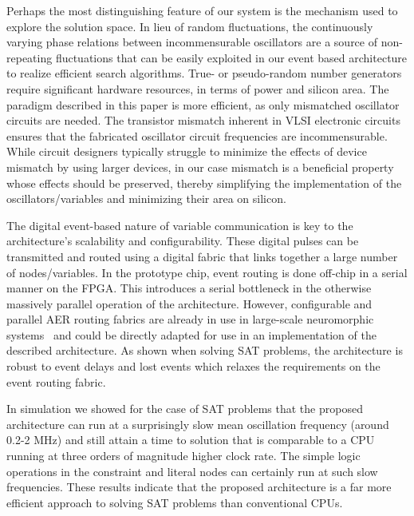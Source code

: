 \documentclass[10pt]{article}
\begin{document}
Perhaps the most distinguishing feature of our system is the mechanism used to explore the solution space. In lieu of random fluctuations, the continuously varying phase relations between incommensurable oscillators are a source of non-repeating fluctuations that can be easily exploited in our event based architecture to realize efficient search algorithms.  True- or pseudo-random number generators require significant hardware resources, in terms of power and silicon area. The paradigm described in this paper is more efficient, as only  mismatched oscillator circuits are needed. The transistor mismatch inherent in VLSI electronic circuits ensures that the fabricated oscillator circuit frequencies are incommensurable. While circuit designers typically struggle to minimize the effects of device mismatch by using larger devices, in our case mismatch is a beneficial property whose effects should be preserved, thereby simplifying the implementation of the oscillators/variables and minimizing their area on silicon.

The digital event-based nature of variable communication is key to the architecture's scalability and configurability. These digital pulses can be transmitted and routed using a digital fabric that links together a large number of nodes/variables. In the prototype chip, event routing is done off-chip in a serial manner on the FPGA. This introduces a serial bottleneck in the otherwise massively parallel operation of the architecture. However, configurable and parallel AER routing fabrics are already in use in large-scale neuromorphic systems~\cite{Joshi_etal10,Merolla_etal14} and could be directly adapted for use in an implementation of the described architecture. As shown when solving SAT problems, the architecture is robust to event delays and lost events which relaxes the requirements on the event routing fabric. 

In simulation we showed for the case of SAT problems that the proposed architecture can run at a surprisingly slow mean oscillation frequency (around 0.2-2 MHz) and still attain a time to solution that is comparable to a CPU running at three orders of magnitude higher clock rate. The simple logic operations in the constraint and literal nodes can certainly run at such slow frequencies. These results indicate that the proposed architecture is a far more efficient approach to solving SAT problems than conventional CPUs. 
\end{document}
